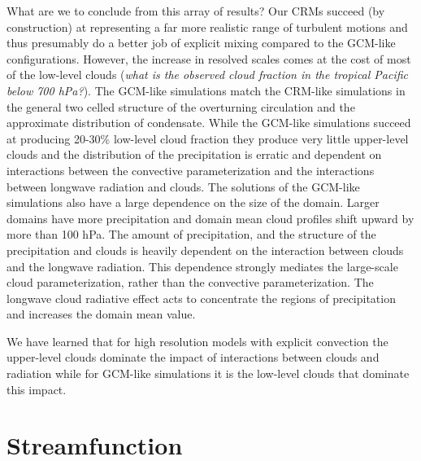 \documentclass[draft]{agujournal2019}
\begin{document}
What are we to conclude from this array of results?  Our CRMs succeed (by construction) at representing a far more 
realistic range of turbulent motions and thus presumably do a better job of explicit mixing compared to the GCM-like 
configurations.  However, the increase in resolved scales comes at the cost of most of the low-level clouds (\textit{what is 
the observed cloud fraction in the tropical Pacific below 700 hPa?}).  The GCM-like simulations match the CRM-like 
simulations  in the general two celled structure of the overturning circulation and the approximate distribution of condensate.  
While the GCM-like simulations succeed at producing 20-30\% low-level cloud fraction they produce very little upper-level 
clouds and the distribution of the precipitation is erratic and dependent on interactions between the convective 
parameterization and the interactions between longwave radiation and clouds.  The solutions of the GCM-like simulations 
also have a large dependence on the size of the domain.  Larger domains have more precipitation and domain mean 
cloud profiles shift upward by more than 100 hPa.  The amount of precipitation, and the structure of the precipitation and clouds 
is heavily dependent on the interaction between clouds and the longwave radiation.  This dependence strongly mediates
the large-scale cloud parameterization, rather than the convective parameterization.  The longwave cloud radiative 
effect acts to concentrate the regions of precipitation and increases the domain mean value.   

We have learned that for high resolution models with explicit convection the upper-level clouds dominate the impact
of interactions between clouds and radiation while for GCM-like simulations it is the low-level clouds that dominate
this impact.  


%




\appendix


\section{Streamfunction}
\end{document}
